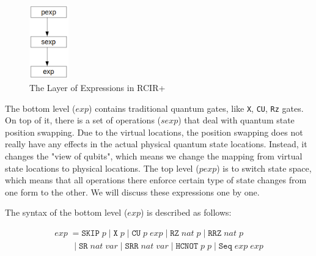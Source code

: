 \begin{figure}[h]
\centering
\includegraphics[width=0.15\textwidth]{exp_relation.png}
\caption{The Layer of Expressions in RCIR+}
\label{fig:exp-layer}
\end{figure}

The bottom level ($exp$) contains traditional quantum gates, like \texttt{X}, \texttt{CU}, \texttt{Rz} gates. On top of it, there is a set of operations ($sexp$) that deal with quantum state position swapping. Due to the virtual locations, the position swapping does not really have any effects in the actual physical quantum state locations. Instead, it changes the "view of qubits", which means we change the mapping from virtual state locations to physical locations. The top level ($pexp$) is to switch state space, which means that all operations there enforce certain type of state changes from one form to the other. We will discuss these expressions one by one. 

The syntax of the bottom level ($exp$) is described as follows:

\[
\begin{array}{l}
 exp \;= \texttt{SKIP}\; p \;|\; \texttt{X} \;p\; | \;\texttt{CU} \;p\; exp
        \;| \;\texttt{RZ} \;nat \;p
        \;|\; \texttt{RRZ} \;nat\; p 
\\\qquad
        \;|\; \texttt{SR}\; nat\; var
        \;|\; \texttt{SRR}\; nat\; var
        \;|\; \texttt{HCNOT} \;p\;p
        \;|\; \texttt{Seq} \;exp\; exp
\end{array}
\]

